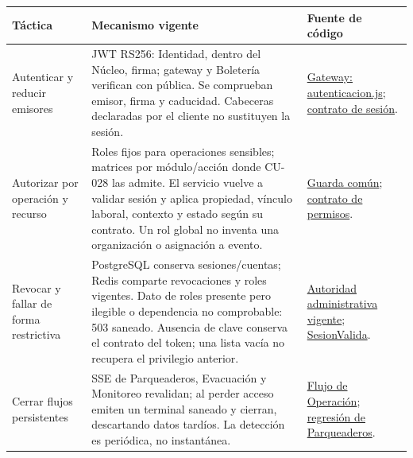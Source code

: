 \begin{center}
\begin{longtable}{P{3.0cm}P{6.0cm}P{4.6cm}}
\toprule
\textbf{Táctica} & \textbf{Mecanismo vigente} & \textbf{Fuente de código}\\
\midrule\endhead
Autenticar y reducir emisores & JWT RS256: Identidad, dentro del Núcleo, firma;
gateway y Boletería verifican con pública. Se comprueban emisor, firma y
caducidad. Cabeceras declaradas por el cliente no sustituyen la sesión. &
\href{https://github.com/Emperador24/HEXACORE/blob/9bc1ee5/App/gateway/autenticacion.js}{Gateway: autenticacion.js};
\href{https://github.com/Emperador24/HEXACORE/blob/9bc1ee5/App/shared/seguridad/token-sesion.md}{contrato de sesión}.\\
\midrule
Autorizar por operación y recurso & Roles fijos para operaciones sensibles;
matrices por módulo/acción donde CU-028 las admite. El servicio vuelve a validar
sesión y aplica propiedad, vínculo laboral, contexto y estado según su contrato.
Un rol global no inventa una organización o asignación a evento. &
\href{https://github.com/Emperador24/HEXACORE/blob/9bc1ee5/App/backend/compartido/seguridad/sesion-valida.guard.ts}{Guarda común};
\href{https://github.com/Emperador24/HEXACORE/blob/9bc1ee5/App/shared/seguridad/permisos.md}{contrato de permisos}.\\
\midrule
Revocar y fallar de forma restrictiva & PostgreSQL conserva sesiones/cuentas;
Redis comparte revocaciones y roles vigentes. Dato de roles presente pero
ilegible o dependencia no comprobable: 503 saneado. Ausencia de clave conserva
el contrato del token; una lista vacía no recupera el privilegio anterior. &
\href{https://github.com/Emperador24/HEXACORE/blob/9bc1ee5/App/backend/modulos/identidad/administracion-cuentas/administrador-requerido.guard.ts}{Autoridad administrativa vigente};
\href{https://github.com/Emperador24/HEXACORE/blob/9bc1ee5/App/backend/compartido/seguridad/sesion-valida.guard.ts}{SesionValida}.\\
\midrule
Cerrar flujos persistentes & SSE de Parqueaderos, Evacuación y Monitoreo
revalidan; al perder acceso emiten un terminal saneado y cierran, descartando
datos tardíos. La detección es periódica, no instantánea. &
\href{https://github.com/Emperador24/HEXACORE/blob/9bc1ee5/App/backend/modulos/operacion/comun/flujo-operacion.service.ts}{Flujo de Operación};
\href{https://github.com/Emperador24/HEXACORE/blob/9bc1ee5/App/infra/informe-atributos/seguridad/AUTORIZACION-SSE.md}{regresión de Parqueaderos}.\\

\end{longtable}
\end{center}

